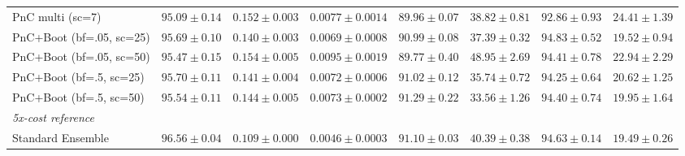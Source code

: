 \begin{table}[t]
{\begin{tabular}{l c c c c c c c}
  PnC multi (sc=7) & $95.09 \pm 0.14$ & $0.152 \pm 0.003$ & $0.0077 \pm 0.0014$ & $89.96 \pm 0.07$ & $38.82 \pm 0.81$ & $92.86 \pm 0.93$ & $24.41 \pm 1.39$ \\
  PnC+Boot (bf=.05, sc=25) & $95.69 \pm 0.10$ & \textbf{$0.140 \pm 0.003$} & \textbf{$0.0069 \pm 0.0008$} & $90.99 \pm 0.08$ & $37.39 \pm 0.32$ & \textbf{$94.83 \pm 0.52$} & \textbf{$19.52 \pm 0.94$} \\
  PnC+Boot (bf=.05, sc=50) & $95.47 \pm 0.15$ & $0.154 \pm 0.005$ & $0.0095 \pm 0.0019$ & $89.77 \pm 0.40$ & $48.95 \pm 2.69$ & $94.41 \pm 0.78$ & $22.94 \pm 2.29$ \\
  PnC+Boot (bf=.5, sc=25) & $95.70 \pm 0.11$ & $0.141 \pm 0.004$ & $0.0072 \pm 0.0006$ & $91.02 \pm 0.12$ & $35.74 \pm 0.72$ & $94.25 \pm 0.64$ & $20.62 \pm 1.25$ \\
  PnC+Boot (bf=.5, sc=50) & $95.54 \pm 0.11$ & $0.144 \pm 0.005$ & $0.0073 \pm 0.0002$ & $91.29 \pm 0.22$ & $33.56 \pm 1.26$ & $94.40 \pm 0.74$ & $19.95 \pm 1.64$ \\
\midrule
\multicolumn{8}{l}{\textit{5x-cost reference}} \\
  Standard Ensemble & $96.56 \pm 0.04$ & $0.109 \pm 0.000$ & $0.0046 \pm 0.0003$ & $91.10 \pm 0.03$ & $40.39 \pm 0.38$ & $94.63 \pm 0.14$ & $19.49 \pm 0.26$ \\
\bottomrule
\end{tabular}}
\end{table}